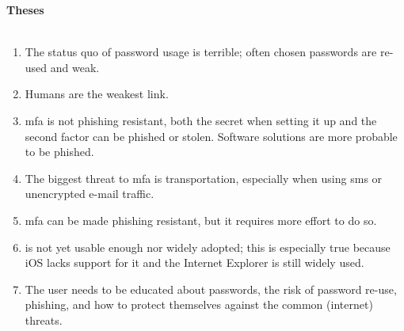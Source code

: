 \thispagestyle{noheader}

\begin{large}
	\textbf{Theses} \\ \\
\end{large}


\begin{enumerate}
	\setlength{\itemsep}{1cm}
	\item The status quo of password usage is terrible; often chosen passwords are re-used and weak.
	\item Humans are the weakest link.
	\item \Glsdesc{mfa} is not phishing resistant, both the secret when setting it up and the second factor can be phished or stolen. Software solutions are more probable to be phished.
	\item The biggest threat to \glsdesc{mfa} is transportation, especially when using \gls{sms} or unencrypted e-mail traffic.
	\item \Glsdesc{mfa} can be made phishing resistant, but it requires more effort to do so.
	\item \wa{} is not yet usable enough nor widely adopted; this is especially true because iOS lacks support for it and the Internet Explorer is still widely used.
	\item The user needs to be educated about passwords, the risk of password re-use, phishing, and how to protect themselves against the common (internet) threats.
\end{enumerate}
